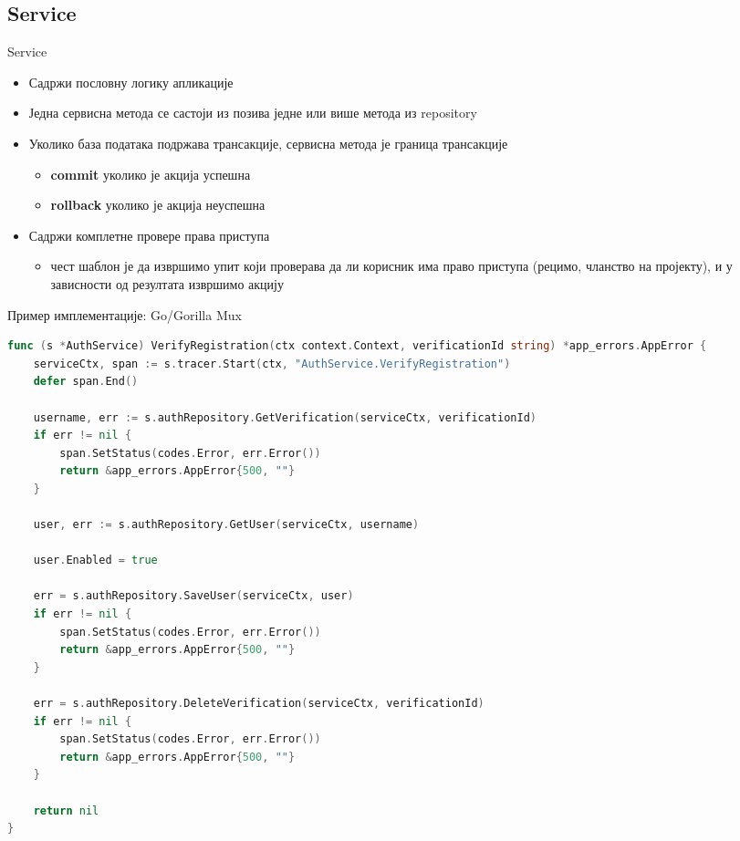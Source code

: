 \documentclass{beamer}
\begin{document}
    \subsection{Service}
    
    \begin{frame}{Service}
        \begin{itemize}
            \item Садржи пословну логику апликације
            \item Једна сервисна метода се састоји из позива једне или више метода из repository
            \item Уколико база података подржава трансакције, сервисна метода је граница трансакције
            \begin{itemize}
                \item \textbf{commit} уколико је акција успешна
                \item \textbf{rollback} уколико је акција неуспешна
            \end{itemize}
            \item Садржи комплетне провере права приступа
            \begin{itemize}
                \item чест шаблон је да извршимо упит који проверава да ли корисник има право приступа (рецимо, чланство на пројекту), и у зависности од резултата извршимо акцију
            \end{itemize}
        \end{itemize}
    \end{frame}
    
    \begin{frame}[fragile]{Пример имплементације: Go/Gorilla Mux}
        \begin{adjustbox}{width=\textwidth,height=\textheight,keepaspectratio}
            \begin{lstlisting}[language=go]
func (s *AuthService) VerifyRegistration(ctx context.Context, verificationId string) *app_errors.AppError {
    serviceCtx, span := s.tracer.Start(ctx, "AuthService.VerifyRegistration")
    defer span.End()

    username, err := s.authRepository.GetVerification(serviceCtx, verificationId)
    if err != nil {
        span.SetStatus(codes.Error, err.Error())
        return &app_errors.AppError{500, ""}
    }

    user, err := s.authRepository.GetUser(serviceCtx, username)

    user.Enabled = true

    err = s.authRepository.SaveUser(serviceCtx, user)
    if err != nil {
        span.SetStatus(codes.Error, err.Error())
        return &app_errors.AppError{500, ""}
    }

    err = s.authRepository.DeleteVerification(serviceCtx, verificationId)
    if err != nil {
        span.SetStatus(codes.Error, err.Error())
        return &app_errors.AppError{500, ""}
    }

    return nil
}
            \end{lstlisting}
        \end{adjustbox}
    \end{frame}
    
\end{document}

